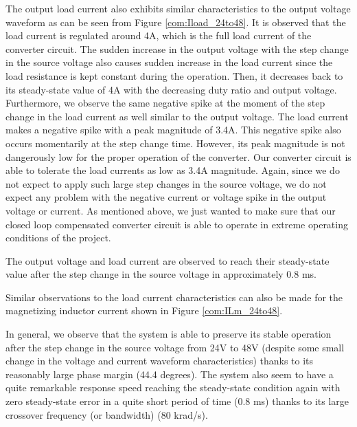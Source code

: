 The output load current also exhibits similar characteristics to the output voltage waveform as can be seen from Figure \ref{com:Iload_24to48}. It is observed that the load current is regulated around 4A, which is the full load current of the converter circuit. The sudden increase in the output voltage with the step change in the source voltage also causes sudden increase in the load current since the load resistance is kept constant during the operation. Then, it decreases back to its steady-state value of 4A with the decreasing duty ratio and output voltage. Furthermore, we observe the same negative spike at the moment of the step change in the load current as well similar to the output voltage. The load current makes a negative spike with a peak magnitude of 3.4A. This negative spike also occurs momentarily at the step change time. However, its peak magnitude is not dangerously low for the proper operation of the converter. Our converter circuit is able to tolerate the load currents as low as 3.4A magnitude. Again, since we do not expect to apply such large step changes in the source voltage, we do not expect any problem with the negative current or voltage spike in the output voltage or current. As mentioned above, we just wanted to make sure that our closed loop compensated converter circuit is able to operate in extreme operating conditions of the project.

The output voltage and load current are observed to reach their steady-state value after the step change in the source voltage in approximately 0.8 ms.

Similar observations to the load current characteristics can also be made for the magnetizing inductor current shown in Figure \ref{com:ILm_24to48}.

In general, we observe that the system is able to preserve its stable operation after the step change in the source voltage from 24V to 48V (despite some small change in the voltage and current waveform characteristics) thanks to its reasonably large phase margin (44.4 degrees). The system also seem to have a quite remarkable response speed reaching the steady-state condition again with zero steady-state error in a quite short period of time (0.8 ms) thanks to its large crossover frequency (or bandwidth) (80 krad/s).